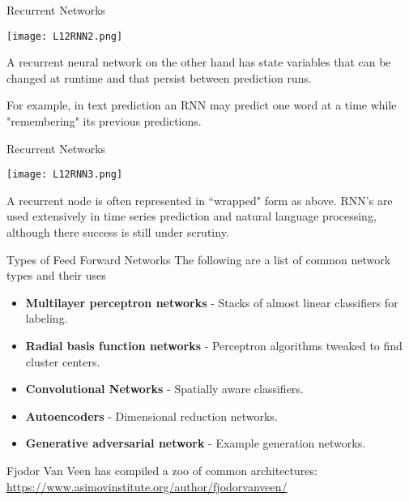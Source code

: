\documentclass[10pt, table, dvipsnames,xcdraw, handout]{beamer}
\begin{document}
\begin{frame}[fragile]{Recurrent Networks}
  \begin{minipage}[t][0.5\textheight][t]{\textwidth}
	\centering \texttt{[image: L12RNN2.png]} 
  \end{minipage}
  \vfill
\begin{minipage}[t][0.5\textheight][t]{\textwidth}
A recurrent neural network on the other hand has state variables that can be changed at runtime and that persist between prediction runs.\newline

For example, in text prediction an RNN may predict one word at a time while "remembering" its previous predictions. 
\end{minipage}
\end{frame}




\begin{frame}[fragile]{Recurrent Networks}
  \begin{minipage}[t][0.5\textheight][t]{\textwidth}
	\centering \texttt{[image: L12RNN3.png]} 
  \end{minipage}
  \vfill
\begin{minipage}[t][0.5\textheight][t]{\textwidth}
A recurrent node is often represented in ``wrapped" form as above. RNN's are used extensively in time series prediction and natural language processing, although there success is still under scrutiny. 
\end{minipage}
\end{frame}





\begin{frame}[fragile]{Types of Feed Forward Networks}
The following are a list of common network types and their uses

\begin{itemize}
\item[] \textbf{Multilayer perceptron networks} - Stacks of almost linear classifiers for labeling. \pause
\item[] \textbf{Radial basis function networks} - Perceptron algorithms tweaked to find cluster centers.  \pause
\item[] \textbf{Convolutional Networks} - Spatially aware classifiers.\pause
\item[] \textbf{Autoencoders} - Dimensional reduction networks. \pause
\item[] \textbf{Generative adversarial network} - Example generation networks. \pause
\end{itemize}
Fjodor Van Veen has compiled a zoo of common architectures: 
\url{https://www.asimovinstitute.org/author/fjodorvanveen/}
\end{frame}
\end{document}
